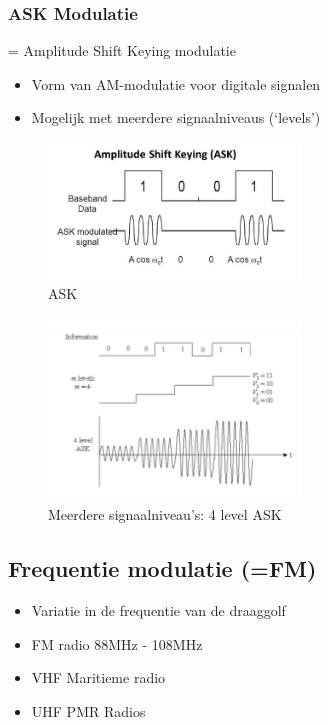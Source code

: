 \documentclass{article}
\begin{document}
\subsubsection{ASK Modulatie}
= Amplitude Shift Keying modulatie
\begin{itemize}
    \item Vorm van AM-modulatie voor digitale signalen
    \item Mogelijk met meerdere signaalniveaus (`levels')
\end{itemize}

\begin{figure}[H]
    \centering
    \includegraphics[width=0.6\textwidth]{Screenshot_20200302_121007.png}
    \caption{ASK}
\end{figure}

\begin{figure}[H]
    \centering
    \includegraphics[width=0.6\textwidth]{Screenshot_20200302_121031.png}
    \caption{Meerdere signaalniveau's: 4 level ASK}
\end{figure}

\subsection{Frequentie modulatie (=FM)}
\begin{itemize}
    \item Variatie in de frequentie van de draaggolf
    \item FM radio 88MHz - 108MHz
    \item VHF Maritieme radio
    \item UHF PMR Radios
\end{itemize}
\end{document}
